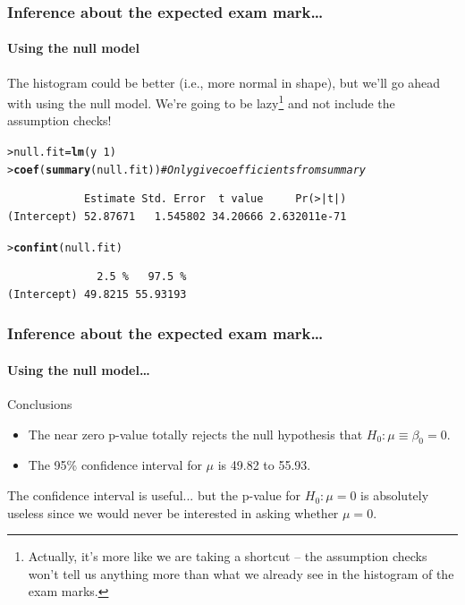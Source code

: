 \documentclass{beamer}\usepackage[]{graphicx}\usepackage[]{xcolor}
\makeatletter
\newcommand{\hlnum}[1]{\textcolor[rgb]{0.686,0.059,0.569}{#1}}%
\newcommand{\hlcom}[1]{\textcolor[rgb]{0.678,0.584,0.686}{\textit{#1}}}%
\newcommand{\hlopt}[1]{\textcolor[rgb]{0,0,0}{#1}}%
\newcommand{\hlstd}[1]{\textcolor[rgb]{0.345,0.345,0.345}{#1}}%
\newcommand{\hlkwb}[1]{\textcolor[rgb]{0.69,0.353,0.396}{#1}}%
\newcommand{\hlkwd}[1]{\textcolor[rgb]{0.737,0.353,0.396}{\textbf{#1}}}%
\newenvironment{kframe}{%
 \def\at@end@of@kframe{}%
 \ifinner\ifhmode%
  \def\at@end@of@kframe{\end{minipage}}%
  \begin{minipage}{\columnwidth}%
 \fi\fi%
 \def\FrameCommand##1{\hskip\@totalleftmargin \hskip-\fboxsep
 \colorbox{shadecolor}{##1}\hskip-\fboxsep
     \hskip-\linewidth \hskip-\@totalleftmargin \hskip\columnwidth}%
 \MakeFramed {\advance\hsize-\width
   \@totalleftmargin\z@ \linewidth\hsize
   \@setminipage}}%
 {\par\unskip\endMakeFramed%
 \at@end@of@kframe}
\newenvironment{knitrout}{}{} %
\makeatother
\begin{document}
\begin{frame}[fragile]
\frametitle{Inference about the expected exam mark\ldots}
\framesubtitle{Using the null model}
The histogram could be better (i.e., more normal in shape), but we'll go ahead with using the null model. We're going to be lazy\footnote{Actually, it's more like we are taking a shortcut -- the assumption checks won't tell us anything more than what we already see in the histogram of the exam marks. } and not include the assumption checks! 
\medskip

\begin{knitrout}\scriptsize
{}\color{fgcolor}\begin{kframe}
\begin{alltt}
\hlstd{> }\hlstd{null.fit}\hlkwb{=}\hlkwd{lm}\hlstd{(y}\hlopt{~}\hlnum{1}\hlstd{)}
\hlstd{> }\hlkwd{coef}\hlstd{(}\hlkwd{summary}\hlstd{(null.fit))} \hlcom{#Only give coefficients from summary}
\end{alltt}
\begin{verbatim}
            Estimate Std. Error  t value     Pr(>|t|)
(Intercept) 52.87671   1.545802 34.20666 2.632011e-71
\end{verbatim}
\begin{alltt}
\hlstd{> }\hlkwd{confint}\hlstd{(null.fit)}
\end{alltt}
\begin{verbatim}
              2.5 %   97.5 %
(Intercept) 49.8215 55.93193
\end{verbatim}
\end{kframe}
\end{knitrout}
\end{frame}



\begin{frame}
\frametitle{Inference about the expected exam mark\ldots}
\framesubtitle{Using the null model\ldots}
Conclusions

\begin{itemize}
\item The near zero  p-value totally rejects the null hypothesis that $H_0: \mu \equiv \beta_0 =0$.
\item The 95\% confidence interval for $\mu$ is 49.82 to 55.93.
\end{itemize}
\bigskip

The confidence interval is useful... but the p-value for $H_0: \mu =0$ is absolutely useless since we would never be interested in asking whether $\mu=0$.
\end{frame}
\end{document}
